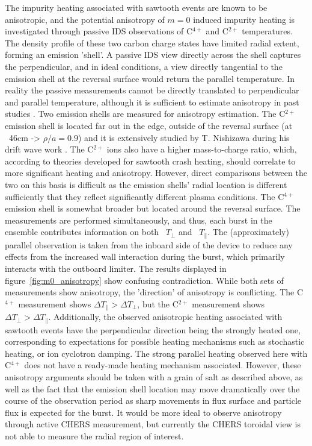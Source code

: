 \begin{refsection}
The impurity heating associated with sawtooth events are known to be anisotropic, and the potential anisotropy of $m = 0$ induced impurity heating is investigated through passive IDS observations of C$^{4+}$ and C$^{2+}$ temperatures. The density profile of these two carbon charge states have limited radial extent, forming an emission 'shell'. A passive IDS view directly across the shell captures the perpendicular, and in ideal conditions, a view directly tangential to the emission shell at the reversal surface would return the parallel temperature. In reality the passive measurements cannot be directly translated to perpendicular and parallel temperature, although it is sufficient to estimate anisotropy in past studies \cite{Magee2011,Magee2011a}. Two emission shells are measured for anisotropy estimation. The C$^{2+}$ emission shell is located far out in the edge, outside of the reversal surface (at ~46cm -> $\rho/a = 0.9$) and it is extensively studied by T. Nishizawa during his drift wave work \cite{Nishizawa2018, Nishizawa2018b}. The C$^{2+}$ ions also have a higher mass-to-charge ratio, which, according to theories developed for sawtooth crash heating, should correlate to more significant heating and anisotropy\cite{Fiksel2009,Tangri}. However, direct comparisons between the two on this basis is difficult as the emission shells' radial location is different sufficiently that they reflect significantly different plasma conditions. The C$^{4+}$ emission shell is somewhat broader but located around the reversal surface. The measurements are performed simultaneously, and thus, each burst in the ensemble contributes information on both ~$T_{\perp}$ and ~$T_{\parallel}$. The (approximately) parallel observation is taken from the inboard side of the device to reduce any effects from the increased wall interaction during the burst, which primarily interacts with the outboard limiter. The results displayed in figure~\ref{fig:m0_anisotropy} show confusing contradiction. While both sets of measurements show anisotropy, the 'direction' of anisotropy is conflicting. The C$^{4+}$ measurement shows $\Delta T_{\parallel} > \Delta T_{\perp}$, but the C$^{2+}$ measurement shows $\Delta T_{\perp} > \Delta T_{\parallel}$. Additionally, the observed anisotropic heating associated with sawtooth events have the perpendicular direction being the strongly heated one, corresponding to expectations for possible heating mechanisms such as stochastic heating, or ion cyclotron damping. The strong parallel heating observed here with C$^{4+}$ does not have a ready-made heating mechanism associated. However, these anisotropy arguments should be taken with a grain of salt as described above, as well as the fact that the emission shell location may move dramatically over the course of the observation period as sharp movements in flux surface and particle flux is expected for the burst. It would be more ideal to observe anisotropy through active CHERS measurement, but currently the CHERS toroidal view is not able to measure the radial region of interest. 


\end{refsection}
